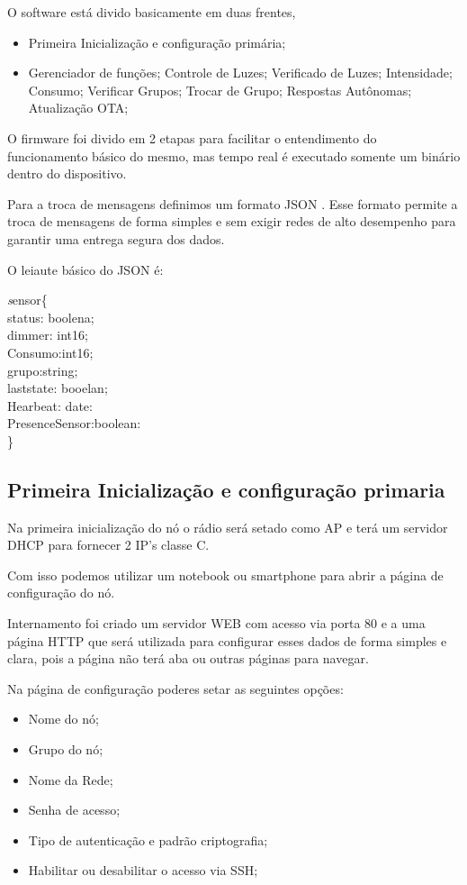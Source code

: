 \documentclass[openright]{normas-utf-tex} %
\begin{document}
O software está divido basicamente em duas frentes,

\begin{itemize}
    \item Primeira Inicialização e configuração primária;
    \item Gerenciador de funções;
    \subitem Controle de Luzes;
    \subitem Verificado de Luzes;
    \subitem Intensidade;
    \subitem Consumo;
    \subitem Verificar Grupos;
    \subitem Trocar de Grupo;
    \subitem Respostas Autônomas;
    \subitem Atualização OTA;
\end{itemize}

O firmware foi divido em 2 etapas para facilitar o entendimento do funcionamento básico do mesmo, mas tempo real é executado somente um binário dentro do dispositivo.

Para a troca de mensagens definimos um formato JSON \cite{json-devmedia}. Esse formato permite a troca de mensagens de forma simples e sem exigir redes de alto desempenho para garantir uma entrega segura dos dados.

O leiaute básico do JSON é:

\begin{center}
\textit
sensor\{\\ 
status: boolena; \\
dimmer: int16;\\
Consumo:int16; \\
grupo:string;\\
laststate: booelan;\\
Hearbeat: date: \\
PresenceSensor:boolean:\\
\}
\end{center}
\subsection{Primeira Inicialização e configuração primaria}


Na primeira inicialização do nó o rádio será setado como AP e terá um servidor DHCP para fornecer 2 IP's classe C.

Com isso podemos utilizar um notebook ou smartphone para abrir a página de configuração do nó.

Internamento foi criado um servidor WEB com acesso via porta 80 e a uma página HTTP que será utilizada para configurar esses dados de forma simples e clara, pois a página não terá aba ou outras páginas para navegar.

Na página de configuração poderes setar as seguintes opções:
\begin{itemize}
    \item Nome do nó;
    \item Grupo do nó;
    \item Nome da Rede;
    \item Senha de acesso;
    \item Tipo de autenticação e padrão criptografia;
    \item Habilitar ou desabilitar o acesso via SSH;
\end{itemize}
\end{document}
